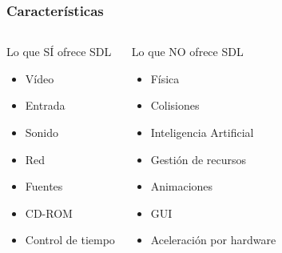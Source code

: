 \begin{frame}
    \frametitle{Características}
    
    
    \begin{columns}[c]
		\column{160pt}
		\begin{block}{Lo que SÍ ofrece SDL}
            \begin{itemize}
                \item Vídeo
                \item Entrada
                \item Sonido
                \item Red
                \item Fuentes
                \item CD-ROM
                \item Control de tiempo
            \end{itemize}            
        \end{block}
        
		\column{160pt}
        
        \begin{alertblock}{Lo que NO ofrece SDL}
            \begin{itemize}
                \item Física
                \item Colisiones
                \item Inteligencia Artificial
                \item Gestión de recursos
                \item Animaciones
                \item GUI
                \item Aceleración por hardware
            \end{itemize}            
        \end{alertblock}
		
	\end{columns} 
\end{frame}


